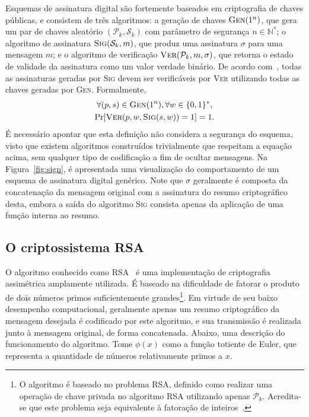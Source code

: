 \documentclass{ufsctex/ufsctex}
\newcommand{\pk}{\mathcal{P}_{k}}
\newcommand{\sk}{\mathcal{S}_{k}}
\newcommand{\binwds}[1]{\{0, 1\}^{#1}}
\begin{document}
Esquemas de assinatura digital são fortemente baseados em criptografia de
chaves públicas, e consistem de três algoritmos: a geração de chaves
$\textsc{Gen}(1^{n})$, que gera um par de chaves aleatório $(\pk{}, \sk{})$ com
parâmetro de segurança $n \in \mathbb{N}^{*}$; o algoritmo de assinatura
$\textsc{Sig}(\sk{}, m)$, que produz uma assinatura $\sigma$ para uma mensagem
$m$; e o algoritmo de verificação $\textsc{Ver}(\pk{}, m, \sigma)$, que retorna
o estado de validade da assinatura como um valor verdade binário. De acordo
com~\cite[Subseção 6.1.3]{Goldreich:book:2004}, todas as assinaturas geradas
por \textsc{Sig} devem ser verificáveis por \textsc{Ver} utilizando todas as
chaves geradas por \textsc{Gen}. Formalmente,
\begin{multline}
  \forall (p, s) \in \textsc{Gen}(1^{n}), \forall w \in \binwds{*}, \\
    \text{Pr}[\textsc{Ver}(p, w, \textsc{Sig}(s, w)) = 1] = 1.
\end{multline}
É necessário apontar que esta definição não considera a segurança do esquema,
visto que existem algoritmos construídos trivialmente que respeitam a equação
acima, sem qualquer tipo de codificação a fim de ocultar mensagens. Na
Figura~\ref{fig:sign}, é apresentada uma visualização do comportamento de um
esquema de assinatura digital genérico. Note que $\sigma$ geralmente é composta
da concatenação da mensagem original com a assinatura do resumo criptográfico
desta, embora a saída do algoritmo \textsc{Sig} consista apenas da aplicação de
uma função interna ao resumo.

\subsection{O criptossistema RSA}\label{subsection:rsa}

O algoritmo conhecido como
RSA~\cite{Rivest:article:1978:feb}
é uma implementação de criptografia assimétrica amplamente utilizada. É baseado
na dificuldade de fatorar o produto de dois números primos suficientemente
grandes\footnote{O algoritmo é baseado no problema RSA, definido como realizar
uma operação de chave privada no algoritmo RSA utilizando apenas $\pk{}$.
Acredita-se que este problema seja equivalente à fatoração de
inteiros~\cite[Fato 3.30]{Menezes:book:1996}.}. Em virtude de seu baixo
desempenho computacional, geralmente apenas um resumo criptográfico da mensagem
desejada é codificado por este algoritmo, e sua transmissão é realizada junto à
mensagem original, de forma concatenada. Abaixo, uma descrição do funcionamento
do algoritmo. Tome $\phi(x)$ como a função totiente de Euler, que representa a
quantidade de números relativamente primos a $x$.
\end{document}
